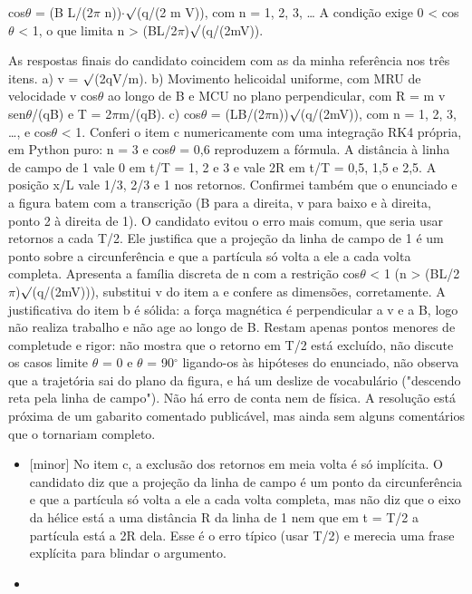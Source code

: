 \documentclass{article}%
\begin{document}
cos$\theta$ = (B L/(2$\pi$ n))$\cdot$$\surd$(q/(2 m V)), com n = 1, 2, 3, \ldots{}\newline%
\newline%
A condição exige 0 < cos$\theta$ < 1, o que limita n > (BL/2$\pi$)$\surd$(q/(2mV)).\par %
As respostas finais do candidato coincidem com as da minha referência nos três itens. a) v = $\surd$(2qV/m). b) Movimento helicoidal uniforme, com MRU de velocidade v cos$\theta$ ao longo de B e MCU no plano perpendicular, com R = m v sen$\theta$/(qB) e T = 2$\pi$m/(qB). c) cos$\theta$ = (LB/(2$\pi$n))$\surd$(q/(2mV)), com n = 1, 2, 3, \ldots{}, e cos$\theta$ < 1. Conferi o item c numericamente com uma integração RK4 própria, em Python puro: n = 3 e cos$\theta$ = 0,6 reproduzem a fórmula. A distância à linha de campo de 1 vale 0 em t/T = 1, 2 e 3 e vale 2R em t/T = 0,5, 1,5 e 2,5. A posição x/L vale 1/3, 2/3 e 1 nos retornos. Confirmei também que o enunciado e a figura batem com a transcrição (B para a direita, v para baixo e à direita, ponto 2 à direita de 1). O candidato evitou o erro mais comum, que seria usar retornos a cada T/2. Ele justifica que a projeção da linha de campo de 1 é um ponto sobre a circunferência e que a partícula só volta a ele a cada volta completa. Apresenta a família discreta de n com a restrição cos$\theta$ < 1 (n > (BL/2$\pi$)$\surd$(q/(2mV))), substitui v do item a e confere as dimensões, corretamente. A justificativa do item b é sólida: a força magnética é perpendicular a v e a B, logo não realiza trabalho e não age ao longo de B. Restam apenas pontos menores de completude e rigor: não mostra que o retorno em T/2 está excluído, não discute os casos limite $\theta$ = 0 e $\theta$ = 90$^\circ$ ligando{-}os às hipóteses do enunciado, não observa que a trajetória sai do plano da figura, e há um deslize de vocabulário ("descendo reta pela linha de campo"). Não há erro de conta nem de física. A resolução está próxima de um gabarito comentado publicável, mas ainda sem alguns comentários que o tornariam completo.%
\begin{itemize}%
\item%
{[}minor{]} No item c, a exclusão dos retornos em meia volta é só implícita. O candidato diz que a projeção da linha de campo é um ponto da circunferência e que a partícula só volta a ele a cada volta completa, mas não diz que o eixo da hélice está a uma distância R da linha de 1 nem que em t = T/2 a partícula está a 2R dela. Esse é o erro típico (usar T/2) e merecia uma frase explícita para blindar o argumento.%
\item%

\end{itemize}$$
\end{document}
